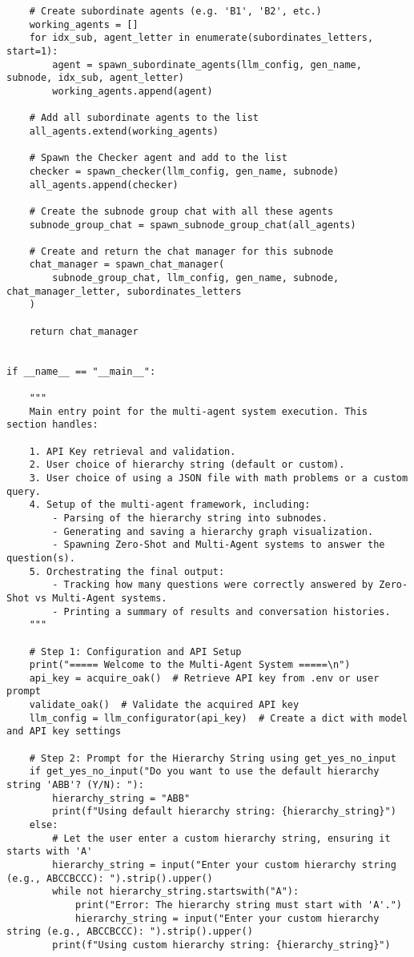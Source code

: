\begin{lstlisting}
    # Create subordinate agents (e.g. 'B1', 'B2', etc.)
    working_agents = []
    for idx_sub, agent_letter in enumerate(subordinates_letters, start=1):
        agent = spawn_subordinate_agents(llm_config, gen_name, subnode, idx_sub, agent_letter)
        working_agents.append(agent)

    # Add all subordinate agents to the list
    all_agents.extend(working_agents)

    # Spawn the Checker agent and add to the list
    checker = spawn_checker(llm_config, gen_name, subnode)
    all_agents.append(checker)

    # Create the subnode group chat with all these agents
    subnode_group_chat = spawn_subnode_group_chat(all_agents)

    # Create and return the chat manager for this subnode
    chat_manager = spawn_chat_manager(
        subnode_group_chat, llm_config, gen_name, subnode, chat_manager_letter, subordinates_letters
    )

    return chat_manager


if __name__ == "__main__":

    """
    Main entry point for the multi-agent system execution. This section handles:

    1. API Key retrieval and validation.
    2. User choice of hierarchy string (default or custom).
    3. User choice of using a JSON file with math problems or a custom query.
    4. Setup of the multi-agent framework, including:
        - Parsing of the hierarchy string into subnodes.
        - Generating and saving a hierarchy graph visualization.
        - Spawning Zero-Shot and Multi-Agent systems to answer the question(s).
    5. Orchestrating the final output:
        - Tracking how many questions were correctly answered by Zero-Shot vs Multi-Agent systems.
        - Printing a summary of results and conversation histories.
    """

    # Step 1: Configuration and API Setup
    print("===== Welcome to the Multi-Agent System =====\n")
    api_key = acquire_oak()  # Retrieve API key from .env or user prompt
    validate_oak()  # Validate the acquired API key
    llm_config = llm_configurator(api_key)  # Create a dict with model and API key settings

    # Step 2: Prompt for the Hierarchy String using get_yes_no_input
    if get_yes_no_input("Do you want to use the default hierarchy string 'ABB'? (Y/N): "):
        hierarchy_string = "ABB"
        print(f"Using default hierarchy string: {hierarchy_string}")
    else:
        # Let the user enter a custom hierarchy string, ensuring it starts with 'A'
        hierarchy_string = input("Enter your custom hierarchy string (e.g., ABCCBCCC): ").strip().upper()
        while not hierarchy_string.startswith("A"):
            print("Error: The hierarchy string must start with 'A'.")
            hierarchy_string = input("Enter your custom hierarchy string (e.g., ABCCBCCC): ").strip().upper()
        print(f"Using custom hierarchy string: {hierarchy_string}")


\end{lstlisting}
